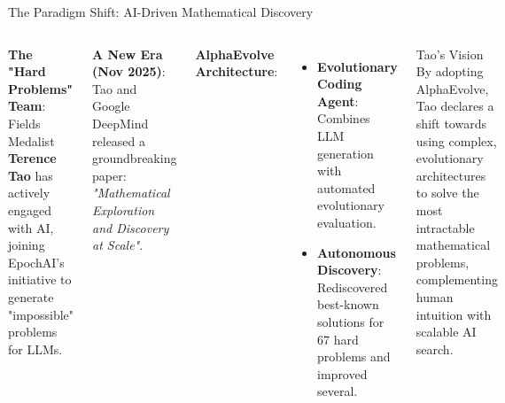 \documentclass[10pt, aspectratio=169]{beamer}
\begin{document}
\begin{frame}{The Paradigm Shift: AI-Driven Mathematical Discovery}
    \begin{columns}
        \textbf{The "Hard Problems" Team}:
        Fields Medalist \textbf{Terence Tao} has actively engaged with AI, joining EpochAI's initiative to generate "impossible" problems for LLMs.
        
        \vspace{0.3cm}
        \textbf{A New Era (Nov 2025)}:
        Tao and Google DeepMind released a groundbreaking paper:
        \textit{"Mathematical Exploration and Discovery at Scale"}.
        
        \vspace{0.3cm}
        \textbf{AlphaEvolve Architecture}:
        \begin{itemize}
            \item \textbf{Evolutionary Coding Agent}: Combines LLM generation with automated evolutionary evaluation.
            \item \textbf{Autonomous Discovery}: Rediscovered best-known solutions for 67 hard problems and improved several.
        \end{itemize}

        \begin{alertblock}{Tao's Vision}
            By adopting AlphaEvolve, Tao declares a shift towards using complex, evolutionary architectures to solve the most intractable mathematical problems, complementing human intuition with scalable AI search.
        \end{alertblock}
    \end{columns}


\end{frame}
\end{document}
